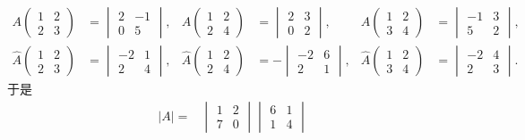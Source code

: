 \begin{example}
\begin{align*}
A\begin{pmatrix}1&2\\2&3\end{pmatrix}&=\begin{vmatrix}2&-1\\0&5\end{vmatrix},&
A\begin{pmatrix}1&2\\2&4\end{pmatrix}&=\begin{vmatrix}2&3\\0&2\end{vmatrix},&
A\begin{pmatrix}1&2\\3&4\end{pmatrix}&=\begin{vmatrix}-1&3\\5&2\end{vmatrix},\\
\hat{A}\begin{pmatrix}1&2\\2&3\end{pmatrix}&=\begin{vmatrix}-2&1\\2&4\end{vmatrix},&
\hat{A}\begin{pmatrix}1&2\\2&4\end{pmatrix}&=-\begin{vmatrix}-2&6\\2&1\end{vmatrix},&
\hat{A}\begin{pmatrix}1&2\\3&4\end{pmatrix}&=\begin{vmatrix}-2&4\\2&3\end{vmatrix}.
\end{align*}
于是
\begin{align*}
|A|={}&
\begin{vmatrix}1&2\\7&0\end{vmatrix}
\begin{vmatrix}6&1\\1&4\end{vmatrix}

\end{align*}
\end{example}
